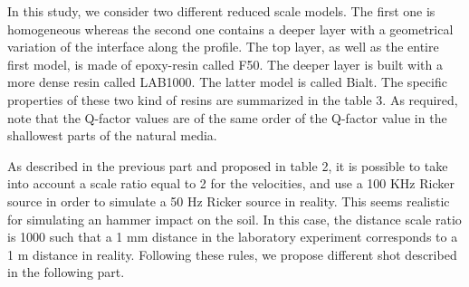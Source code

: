 \documentclass[manuscript,revised]{geophysics}
\begin{document}


\noindent In this study, we consider two different reduced scale models. The first one is homogeneous whereas the second one contains a deeper layer with a geometrical variation of the interface along the profile. The top layer, as well as the entire first model, is made of epoxy-resin called F50. The deeper layer is built with a more dense resin called LAB1000. The latter model is called Bialt. The specific properties of these two kind of resins are summarized in the table 3. As required, note that the Q-factor values are of the same order of the Q-factor value in the shallowest parts of the natural media.

\noindent As described in the previous part and proposed in table 2, it is possible to take into account a scale ratio equal to 2 for the velocities, and use a 100 KHz Ricker source in order to simulate a 50 Hz Ricker source in reality. This seems realistic for simulating an hammer impact on the soil. In this case, the distance scale ratio is 1000 such that a 1 mm distance in the laboratory experiment corresponds to a 1 m distance in reality. Following these rules, we propose different shot described in the following part. 
\end{document}
